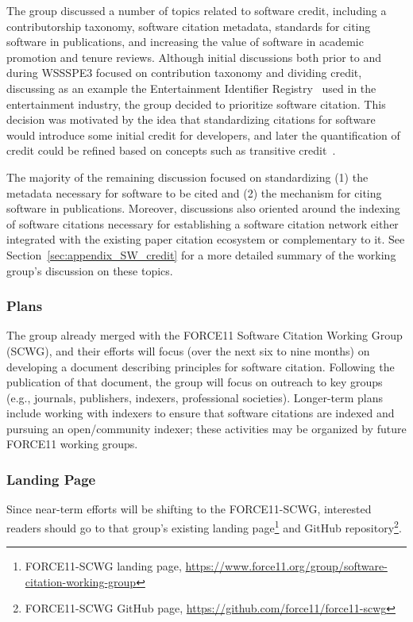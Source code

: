 The group discussed a number of topics related to software credit, including a
contributorship taxonomy, software citation metadata, standards for citing
software in publications, and increasing the value of software in academic
promotion and tenure reviews. Although initial discussions both prior to and
during WSSSPE3 focused on contribution taxonomy and dividing credit, discussing
as an example the Entertainment Identifier Registry~\cite{EIDR} used in the
entertainment industry, the group decided to prioritize software citation. This
decision was motivated by the idea that standardizing citations for software
would introduce some initial credit for developers, and later the quantification
of credit could be refined based on concepts such as transitive
credit~\cite{Katz:2014_tc,katz-smith-tc}.

The majority of the remaining discussion focused on standardizing (1) the
metadata necessary for software to be cited and (2) the mechanism for citing
software in publications. Moreover, discussions also oriented around the
indexing of software citations necessary for establishing a software citation
network either integrated with the existing paper citation ecosystem or
complementary to it. See Section~\ref{sec:appendix_SW_credit} for a more
detailed summary of the working group's discussion on these topics.

\subsubsection{Plans}

The group already merged with the FORCE11 Software Citation Working Group
(SCWG), and their efforts will focus (over the next six to nine months) on
developing a document describing principles for software citation. Following the
publication of that document, the group will focus on outreach to key
groups (e.g., journals, publishers, indexers, professional societies).
Longer-term plans include working with indexers to ensure that software
citations are indexed and pursuing an open\slash community indexer; these
activities may be organized by future FORCE11 working groups.

\subsubsection{Landing Page}

Since near-term efforts will be shifting to the FORCE11-SCWG, 
interested readers should go to that group's existing landing page\footnote{FORCE11-SCWG
landing page,
\url{https://www.force11.org/group/software-citation-working-group}} and GitHub
repository\footnote{FORCE11-SCWG GitHub page,
\url{https://github.com/force11/force11-scwg}}.
